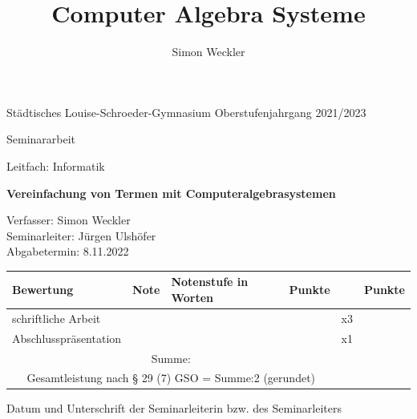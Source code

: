 \documentclass[11pt]{article}
\title{Computer Algebra Systeme}
\author{Simon Weckler}
\begin{document}
Städtisches Louise-Schroeder-Gymnasium
\hfill
Oberstufenjahrgang 2021/2023

\vspace{65pt}

\begin{center}
  {\huge Seminararbeit}
\end{center}

\vspace{35pt}

{\huge Leitfach: Informatik}

\vspace{85pt}

\begin{center}
  {\Huge \textbf{Vereinfachung von Termen mit Computeralgebrasystemen}}
\end{center}

\vspace{85pt}

Verfasser: Simon Weckler \\
Seminarleiter: Jürgen Ulshöfer \\
Abgabetermin: 8.11.2022 \\

\vspace{35pt}

\begin{center}
\begin{tabular}{|l|l|l|l|l|l|}
  \hline
  Bewertung             & Note  & Notenstufe in Worten  & Punkte  &     & Punkte  \\ \hline
  schriftliche Arbeit   &       &                       &         & x3  &         \\ \hline
  Abschlusspräsentation &       &                       &         & x1  &         \\ \hline
  \multicolumn{4}{c}{Summe: } & & \\ \cline{6-6}
  \multicolumn{4}{c}{Gesamtleistung nach § 29 (7) GSO = Summe:2 (gerundet)} & & \\  \cline{6-6}
\end{tabular}
\end{center}

\vspace{35pt}

\hrulefill

Datum und Unterschrift der Seminarleiterin bzw. des Seminarleiters

\newpage

\tableofcontents

\newpage
\end{document}
